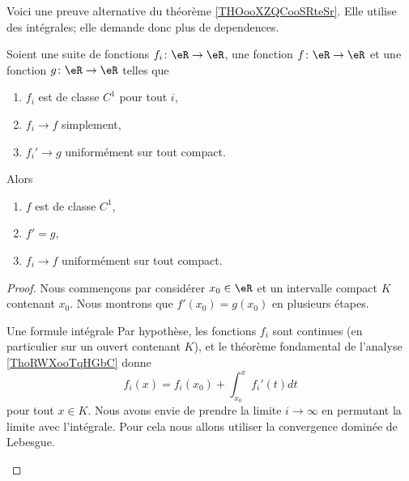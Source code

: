 \begin{normaltext}      \label{NORMALooGYUEooKrYjyz}
    Voici une preuve alternative du théorème \ref{THOooXZQCooSRteSr}. Elle utilise des intégrales; elle demande donc plus de dependences.

\begin{theorem}    
    Soient une suite de fonctions \( f_i\colon \eR\to \eR\), une fonction \( f\colon \eR\to \eR\) et une fonction \( g\colon \eR\to \eR\) telles que
    \begin{enumerate}
        \item
            \( f_i\) est de classe \( C^1\) pour tout \( i\),
        \item
            \( f_i\to f\) simplement,
        \item
            \( f_i'\to g\) uniformément sur tout compact.
    \end{enumerate}
    Alors
    \begin{enumerate}
        \item
            \( f\) est de classe \( C^1\),
        \item
            \( f'=g\),
        \item
            \( f_i\to f\) uniformément sur tout compact.
    \end{enumerate}
\end{theorem}

    \begin{proof}
        Nous commençons par considérer \( x_0\in \eR\) et un intervalle compact \( K\) contenant \( x_0\). Nous montrons que \( f'(x_0)=g(x_0)\) en plusieurs étapes.
        \begin{subproof}
        \item[Une formule intégrale]
        Par hypothèse, les fonctions \( f_i\) sont continues (en particulier sur un ouvert contenant \( K\)), et le théorème fondamental de l'analyse \ref{ThoRWXooTqHGbC} donne
        \begin{equation}        \label{EQooFUBZooOVUhep}
            f_i(x)=f_i(x_0)+\int_{x_0}^xf_i'(t)dt
        \end{equation}
        pour tout \( x\in K\). Nous avons envie de prendre la limite \( i\to \infty\) en permutant la limite avec l'intégrale. Pour cela nous allons utiliser la convergence dominée de Lebesgue.


\end{subproof}
\end{proof}
\end{normaltext}

